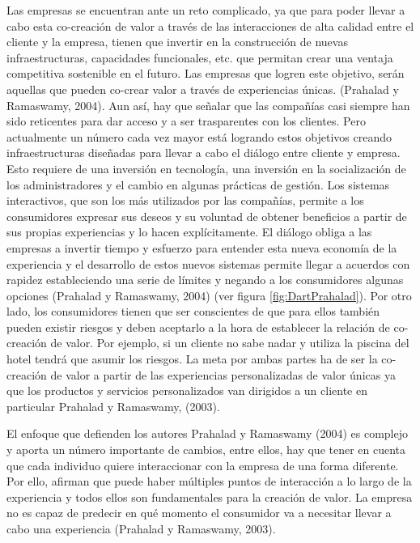 Las empresas se encuentran ante un reto complicado, ya que para poder llevar a cabo esta co-creación de valor a través de las interacciones de alta calidad entre el cliente y la empresa, tienen que invertir en la construcción de nuevas infraestructuras, capacidades funcionales, etc. que permitan crear una ventaja competitiva sostenible en el futuro. Las empresas que logren este objetivo, serán aquellas que pueden co-crear valor a través de experiencias únicas. (Prahalad y Ramaswamy, 2004). Aun así, hay que señalar que las compañías casi siempre han sido reticentes para dar acceso y a ser trasparentes con los clientes. Pero actualmente un número cada vez mayor está logrando estos objetivos creando infraestructuras diseñadas para llevar a cabo el diálogo entre cliente y empresa. Esto requiere de una inversión en tecnología, una inversión en la socialización de los administradores y el cambio en algunas prácticas de gestión. Los sistemas interactivos, que son los más utilizados por las compañías, permite a los consumidores expresar sus deseos y su voluntad de obtener beneficios a partir de sus propias experiencias y lo hacen explícitamente. El diálogo obliga a las empresas a invertir tiempo y esfuerzo para entender esta nueva economía de la experiencia y el desarrollo de estos nuevos sistemas permite llegar a acuerdos con rapidez estableciendo una serie de límites y negando a los consumidores algunas opciones (Prahalad y Ramaswamy, 2004) (ver figura \ref{fig:DartPrahalad}). Por otro lado, los consumidores tienen que ser conscientes de que para ellos también pueden existir riesgos y deben aceptarlo a la hora de establecer la relación de co-creación de valor. Por ejemplo, si un cliente no sabe nadar y utiliza la piscina del hotel tendrá que asumir los riesgos. La meta por ambas partes ha de ser la co-creación de valor a partir de las experiencias personalizadas de valor únicas ya que los productos y servicios personalizados van dirigidos a un cliente en particular Prahalad y Ramaswamy, (2003).

El enfoque que defienden los autores Prahalad y Ramaswamy (2004) es complejo y aporta un número importante de cambios, entre ellos, hay que tener en cuenta que cada individuo quiere interaccionar con la empresa de una forma diferente. Por ello, afirman que puede haber múltiples puntos de interacción a lo largo de la experiencia y todos ellos son fundamentales para la creación de valor. La empresa no es capaz de predecir en qué momento el consumidor va a necesitar llevar a cabo una experiencia (Prahalad y Ramaswamy, 2003).


